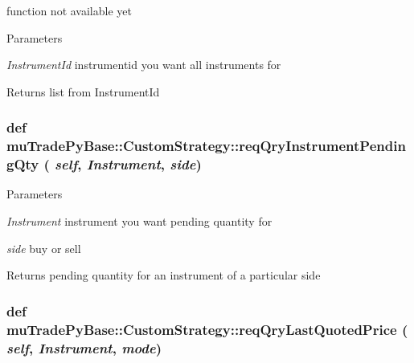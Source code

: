 function not available yet 
\begin{DoxyParams}{Parameters}
\item[{\em InstrumentId}]instrumentid you want all instruments for \end{DoxyParams}
\begin{DoxyReturn}{Returns}
list from InstrumentId 
\end{DoxyReturn}
\hypertarget{classmuTradePyBase_1_1CustomStrategy_a5a88d3465201abc5a438f8a3cbd72149}{
\subsubsection[{reqQryInstrumentPendingQty}]{\setlength{\rightskip}{0pt plus 5cm}def muTradePyBase::CustomStrategy::reqQryInstrumentPendingQty ( {\em self}, \/   {\em Instrument}, \/   {\em side})}}
\label{classmuTradePyBase_1_1CustomStrategy_a5a88d3465201abc5a438f8a3cbd72149}

\begin{DoxyParams}{Parameters}
\item[{\em Instrument}]instrument you want pending quantity for \item[{\em side}]buy or sell \end{DoxyParams}
\begin{DoxyReturn}{Returns}
pending quantity for an instrument of a particular side 
\end{DoxyReturn}
\hypertarget{classmuTradePyBase_1_1CustomStrategy_a58823e909645a91e0c35d8a71cc947e5}{
\subsubsection[{reqQryLastQuotedPrice}]{\setlength{\rightskip}{0pt plus 5cm}def muTradePyBase::CustomStrategy::reqQryLastQuotedPrice ( {\em self}, \/   {\em Instrument}, \/   {\em mode})}}
\label{classmuTradePyBase_1_1CustomStrategy_a58823e909645a91e0c35d8a71cc947e5}

